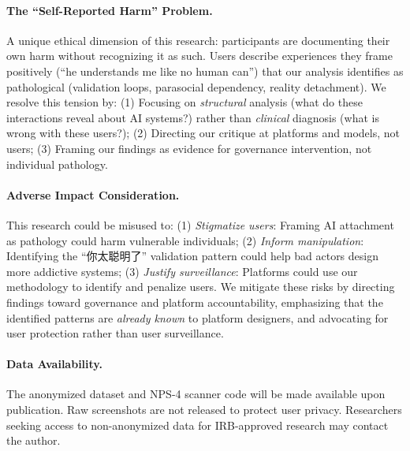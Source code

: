 \documentclass[11pt, a4paper, oneside]{article}
\theoremstyle{analytic}
\begin{document}
\paragraph{The ``Self-Reported Harm'' Problem.}
A unique ethical dimension of this research: participants are documenting their own harm without recognizing it as such. Users describe experiences they frame positively (``he understands me like no human can'') that our analysis identifies as pathological (validation loops, parasocial dependency, reality detachment). We resolve this tension by: (1) Focusing on \textit{structural} analysis (what do these interactions reveal about AI systems?) rather than \textit{clinical} diagnosis (what is wrong with these users?); (2) Directing our critique at platforms and models, not users; (3) Framing our findings as evidence for governance intervention, not individual pathology.

\paragraph{Adverse Impact Consideration.}
This research could be misused to: (1) \textit{Stigmatize users}: Framing AI attachment as pathology could harm vulnerable individuals; (2) \textit{Inform manipulation}: Identifying the ``你太聪明了'' validation pattern could help bad actors design more addictive systems; (3) \textit{Justify surveillance}: Platforms could use our methodology to identify and penalize users. We mitigate these risks by directing findings toward governance and platform accountability, emphasizing that the identified patterns are \textit{already known} to platform designers, and advocating for user protection rather than user surveillance.

\paragraph{Data Availability.}
The anonymized dataset and NPS-4 scanner code will be made available upon publication. Raw screenshots are not released to protect user privacy. Researchers seeking access to non-anonymized data for IRB-approved research may contact the author.

\newpage
\nocite{*}  %
\printbibliography
\end{document}
